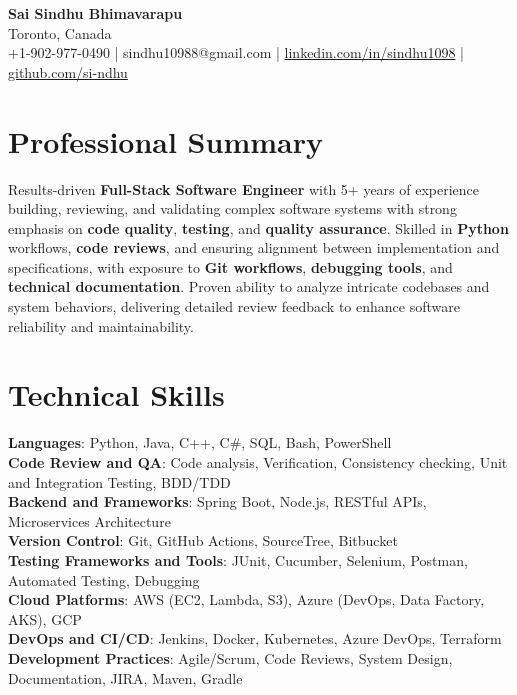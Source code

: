 \documentclass[letterpaper,11pt]{article}
\begin{document}
\begin{center}
  {\Large \textbf{Sai Sindhu Bhimavarapu}} \\
  Toronto, Canada \\
  +1-902-977-0490 \enspace | \enspace sindhu10988@gmail.com \enspace | \enspace \href{https://www.linkedin.com/in/sindhu1098/}{linkedin.com/in/sindhu1098} \enspace | \enspace \href{https://github.com/si-ndhu}{github.com/si-ndhu}
\end{center}

\section{Professional Summary}
  \begin{itemize}[leftmargin=0.15in, label={}]
    \small{\item{
     Results-driven \textbf{Full-Stack Software Engineer} with 5+ years of experience building, reviewing, and validating complex software systems with strong emphasis on \textbf{code quality}, \textbf{testing}, and \textbf{quality assurance}. Skilled in \textbf{Python} workflows, \textbf{code reviews}, and ensuring alignment between implementation and specifications, with exposure to \textbf{Git workflows}, \textbf{debugging tools}, and \textbf{technical documentation}. Proven ability to analyze intricate codebases and system behaviors, delivering detailed review feedback to enhance software reliability and maintainability.
    }}
  \end{itemize}
\vspace{-16pt}

\section{Technical Skills}
 \begin{itemize}[leftmargin=0.15in, label={}]
    \small{\item{
     \textbf{Languages}: Python, Java, C++, C\#, SQL, Bash, PowerShell \\
     \textbf{Code Review and QA}: Code analysis, Verification, Consistency checking, Unit and Integration Testing, BDD/TDD \\
     \textbf{Backend and Frameworks}: Spring Boot, Node.js, RESTful APIs, Microservices Architecture \\
     \textbf{Version Control}: Git, GitHub Actions, SourceTree, Bitbucket \\
     \textbf{Testing Frameworks and Tools}: JUnit, Cucumber, Selenium, Postman, Automated Testing, Debugging \\
     \textbf{Cloud Platforms}: AWS (EC2, Lambda, S3), Azure (DevOps, Data Factory, AKS), GCP \\
     \textbf{DevOps and CI/CD}: Jenkins, Docker, Kubernetes, Azure DevOps, Terraform \\
     \textbf{Development Practices}: Agile/Scrum, Code Reviews, System Design, Documentation, JIRA, Maven, Gradle
    }}
 \end{itemize}
\vspace{-16pt}
\end{document}
